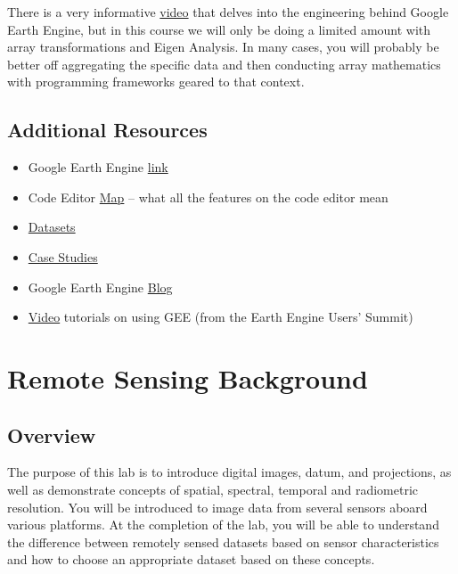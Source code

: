 \documentclass[
]{article}
\providecommand{\tightlist}{%
  \setlength{\itemsep}{0pt}\setlength{\parskip}{0pt}}
\begin{document}
There is a very informative \href{https://developers.google.com/earth-engine/guides/arrays_intro}{video} that delves into the engineering behind Google Earth Engine, but in this course we will only be doing a limited amount with array transformations and Eigen Analysis. In many cases, you will probably be better off aggregating the specific data and then conducting array mathematics with programming frameworks geared to that context.

\hypertarget{additional-resources}{%
\subsection{Additional Resources}\label{additional-resources}}

\begin{itemize}
\tightlist
\item
  Google Earth Engine \href{https://earthengine.google.com}{link}
\item
  Code Editor \href{https://developers.google.com/earth-engine/guides/playground?hl=en}{Map} -- what all the features on the code editor mean
\item
  \href{https://developers.google.com/earth-engine/datasets/}{Datasets}
\item
  \href{https://earthengine.google.com/case_studies/}{Case Studies}
\item
  Google Earth Engine \href{https://medium.com/google-earth}{Blog}
\item
  \href{https://developers.google.com/earth-engine/tutorials/tutorials}{Video} tutorials on using GEE (from the Earth Engine Users' Summit)
\end{itemize}

\hypertarget{lab1}{%
\section{Remote Sensing Background}\label{lab1}}

\hypertarget{overview-1}{%
\subsection*{Overview}\label{overview-1}}

The purpose of this lab is to introduce digital images, datum, and projections, as well as demonstrate concepts of spatial, spectral, temporal and radiometric resolution. You will be introduced to image data from several sensors aboard various platforms. At the completion of the lab, you will be able to understand the difference between remotely sensed datasets based on sensor characteristics and how to choose an appropriate dataset based on these concepts.
\end{document}
